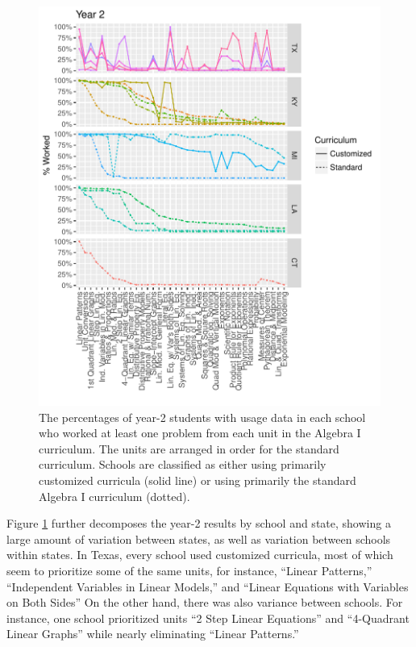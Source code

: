 \documentclass[notitlepage,12pt]{jedm}\usepackage[]{graphicx}\usepackage[]{color}
\makeatletter
\def\maxwidth{ %
  \ifdim\Gin@nat@width>\linewidth
    \linewidth
  \else
    \Gin@nat@width
  \fi
}
\makeatother
\begin{document}
\begin{figure}
  \centering

\includegraphics[width=\maxwidth]{figure/unitsBySchool-1} 

\caption{The percentages of year-2 students with usage data in each
  school who worked at least one problem from each unit in the Algebra I curriculum. The
  units are arranged in order for the standard curriculum. Schools are
  classified as either using primarily customized curricula (solid
  line) or using primarily the standard Algebra I curriculum (dotted).}
\label{fig:unitsBySchool}
\end{figure}

Figure \ref{fig:unitsBySchool} further decomposes the year-2 results
by school and state, showing a large amount of variation between
states, as well as variation between schools within states.
In Texas, every school used customized curricula, most of which seem to
prioritize some of the same units, for instance, ``Linear Patterns,''
``Independent Variables in Linear Models,'' and
``Linear Equations with Variables on Both Sides''
On the other hand, there was also variance between schools.
For instance, one school prioritized units ``2 Step Linear Equations''
and ``4-Quadrant Linear Graphs'' while nearly eliminating ``Linear Patterns.''
\end{document}
